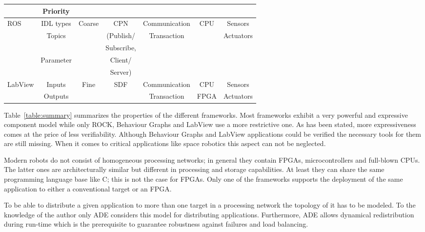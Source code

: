 \documentclass[a4paper,twocolumn]{esapub2005} %
\begin{document}
\begin{table*}
\begin{tabular}{l|cccccc}
               & Priority  &      &        &               &          & \\
        \hline
        ROS    & IDL types & Coarse & CPN      & Communication & CPU & Sensors\\
               & Topics    &        & (Publish/ & Transaction   &     & Actuators\\
               &           &        & Subscribe, &             &     & \\
               & Parameter &        & Client/  &               &     & \\
               &           &        & Server)  &               &     & \\
        \hline
        LabView & Inputs   & Fine   & SDF & Communication & CPU  & Sensors\\
                & Outputs  &        &     & Transaction   & FPGA & Actuators\\
    \end{tabular}
    \caption{
        Evaluation of the different frameworks with respect to defined properties/features.
    }
    \label{table:summary}
\end{table*}
Table~\ref{table:summary} summarizes the properties of the different frameworks.
Most frameworks exhibit a very powerful and expressive component model while only ROCK, Behaviour Graphs and LabView use a more restrictive one.
As has been stated, more expressiveness comes at the price of less verifiability.
Although Behaviour Graphs and LabView applications could be verified the necessary tools for them are still missing.
When it comes to critical applications like space robotics this aspect can not be neglected.

Modern robots do not consist of homogeneous processing networks; in general they contain FPGAs, microcontrollers and full-blown CPUs.
The latter ones are architecturally similar but different in processing and storage capabilities.
At least they can share the same programming language base like C; this is not the case for FPGAs.
Only one of the frameworks supports the deployment of the same application to either a conventional target or an FPGA.

To be able to distribute a given application to more than one target in a processing network the topology of it has to be modeled.
To the knowledge of the author only ADE considers this model for distributing applications.
Furthermore, ADE allows dynamical redistribution during run-time which is the prerequisite to guarantee robustness against failures and load balancing.
\end{document}
